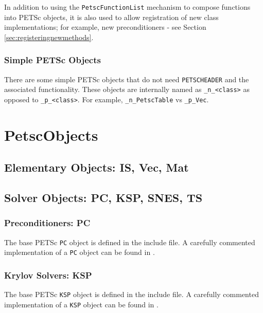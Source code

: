 In addition to using the \lstinline{PetscFunctionList} mechanism to compose functions into PETSc objects, it is also used to allow registration of new class implementations; for example, new preconditioners - see Section \ref{sec:registeringnewmethods}.

\subsection{Simple PETSc Objects}

There are some simple PETSc objects that do not need \lstinline{PETSCHEADER} and
the associated functionality. These objects are internally named as
\lstinline{_n_<class>} as opposed to \lstinline{_p_<class>}. For example, \lstinline{_n_PetscTable}
vs \lstinline{_p_Vec}.

\chapter{PetscObjects}

\section{Elementary Objects: IS, Vec, Mat}

\section{Solver Objects: PC, KSP, SNES, TS}

\subsection{Preconditioners: PC}

The base PETSc \lstinline{PC} object is defined in the \href{http://www.mcs.anl.gov/petsc/petsc-master/include/petsc/private/pcimpl.h.html}{} include file.
A carefully commented implementation of a \lstinline{PC} object can be found in
\href{http://www.mcs.anl.gov/petsc/petsc-master/src/ksp/pc/impls/jacobi/jacobi.c.html}{}.

\subsection{Krylov Solvers: KSP}
The base PETSc \lstinline{KSP} object is defined in the \href{http://www.mcs.anl.gov/petsc/petsc-master/include/petsc/private/kspimpl.h.html}{} include file.
A carefully commented implementation of a \lstinline{KSP} object can be found in
\href{http://www.mcs.anl.gov/petsc/petsc-master/src/ksp/ksp/impls/cg/cg.c.html}{}.

